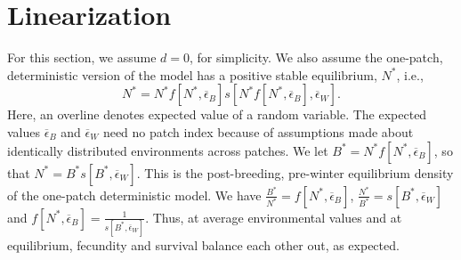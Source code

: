 \documentclass[letterpaper,11pt]{article}
\newcommand{\ole}{\overline{\epsilon}}
\begin{document}

\section{Linearization}

For this section, we assume $d=0$, for simplicity. We also assume the one-patch,
deterministic version of the model has a positive stable equilibrium, $N^*$, i.e.,
\begin{equation}
N^*=N^*f[N^*,\ole_{B}]s[N^*f[N^*,\ole_B],\ole_W].
\end{equation}
Here, an overline denotes expected value of a random variable. The expected
values $\ole_B$ and $\ole_W$ need no patch index because of assumptions
made about identically distributed environments across patches. We let
$B^*=N^*f[N^*,\ole_B]$, so that $N^*=B^*s[B^*,\ole_W]$. This is the post-breeding,
pre-winter equilibrium density of the one-patch deterministic model. We have
$\frac{B^*}{N^*}=f[N^*,\ole_B]$, $\frac{N^*}{B^*}=s[B^*,\ole_W]$ and
$f[N^*,\ole_B]=\frac{1}{s[B^*,\ole_W]}$. Thus, at average
environmental values and at equilibrium, fecundity and survival balance
each other out, as expected.
\end{document}
